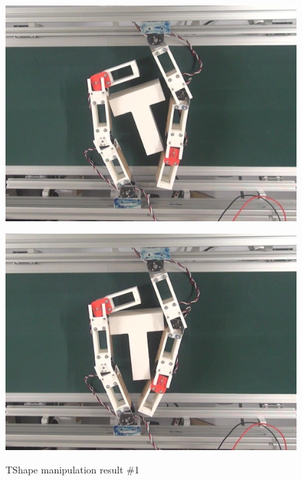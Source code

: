 \documentclass[a4paper,twoside,12pt,papersize, dvipdfmx]{iirthesis}
\begin{document}
\begin{figure}[hbt]
\begin{minipage}{0.249\hsize}
\includegraphics[width=0.98\hsize]{fig/4-manipulation-result/TShape/1-3.jpg}
\subcaption{}\label{}
\end{minipage}\hfill
\begin{minipage}{0.249\hsize}
\centering
\includegraphics[width=0.98\hsize]{fig/4-manipulation-result/TShape/1-4.jpg}
\subcaption{}\label{}
\end{minipage}
\caption{TShape manipulation result \#1}\label{fig::result::tm1}
\end{figure}
\end{document}
